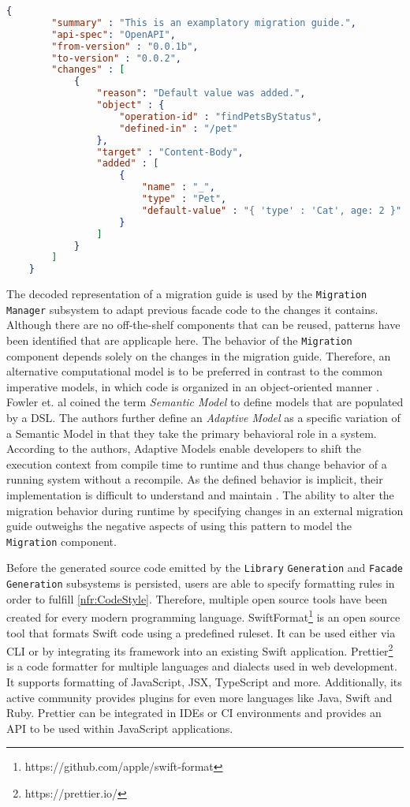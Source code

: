 \vspace{2mm}
 \begin{lstlisting}[language=json, caption={Examplatory migration guide in JSON format}, captionpos=b, label={lst:exampleGuide}]
 	{
 		"summary" : "This is an examplatory migration guide.",
 		"api-spec": "OpenAPI",
 		"from-version" : "0.0.1b",
 		"to-version" : "0.0.2",
 		"changes" : [
	 		{
	 			"reason": "Default value was added.",
	 			"object" : {
	 				"operation-id" : "findPetsByStatus",
	 				"defined-in" : "/pet"
	 			},
	 			"target" : "Content-Body",
	 			"added" : [
		 			{
		 				"name" : "_",
		 				"type" : "Pet",
		 				"default-value" : "{ 'type' : 'Cat', age: 2 }"
		 			}
	 			]
	 		}
 		]
 	}
 \end{lstlisting}
 
The decoded representation of a migration guide is used by the \texttt{Migration} \texttt{Manager} subsystem to adapt previous facade code to the changes it contains. Although there are no off-the-shelf components that can be reused, patterns have been identified that are applicaple here. The behavior of the \texttt{Migration} component depends solely on the changes in the migration guide. Therefore, an alternative computational model is to be preferred in contrast to the common imperative models, in which code is organized in an object-oriented manner \cite{fowler_domain-specific_2011}. Fowler et. al coined the term \textit{Semantic Model} to define models that are populated by a \ac{DSL}.  The authors further define an \textit{Adaptive Model} as a specific variation of a Semantic Model in that they take the primary behavioral role in a system. According to the authors, Adaptive Models enable developers to shift the execution context from compile time to runtime and thus change behavior of a running system without a recompile. As the defined behavior is implicit, their implementation is difficult to understand and maintain \cite{fowler_domain-specific_2011}. The ability to alter the migration behavior during runtime by specifying changes in an external migration guide outweighs the negative aspects of using this pattern to model the \texttt{Migration} component. 

Before the generated source code emitted by the \texttt{Library} \texttt{Generation} and \texttt{Facade} \texttt{Generation} subsystems is persisted, users are able to specify formatting rules in order to fulfill \ref{nfr:CodeStyle}. Therefore, multiple open source tools have been created for every modern programming language. SwiftFormat\footnote{https://github.com/apple/swift-format} is an open source tool that formats Swift code using a predefined ruleset. It can be used either via \ac{CLI} or by integrating its framework into an existing Swift application. Prettier\footnote{https://prettier.io/} is a code formatter for multiple languages and dialects used in web development. It supports formatting of JavaScript, JSX, TypeScript and more. Additionally, its active community provides plugins for even more languages like Java, Swift and Ruby. Prettier can be integrated in \acp{IDE} or CI environments and provides an \ac{API} to be used within JavaScript applications. 

